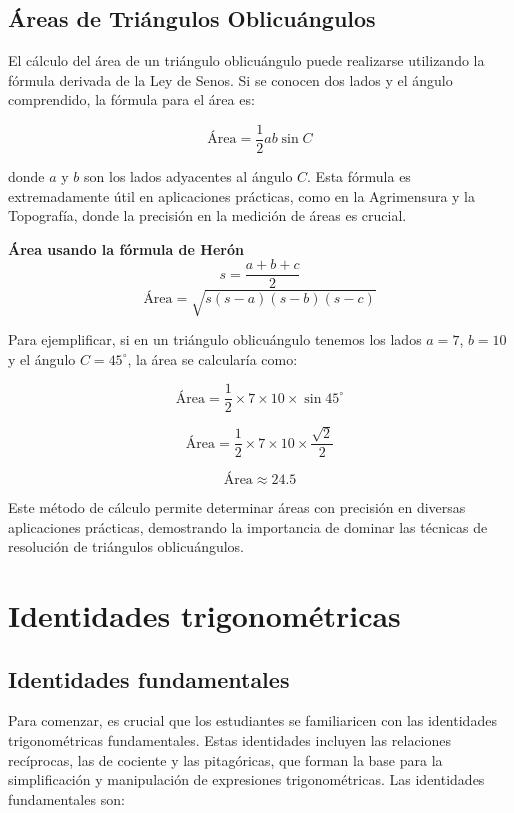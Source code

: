 \subsection{Áreas de Triángulos Oblicuángulos}

El cálculo del área de un triángulo oblicuángulo puede realizarse utilizando la fórmula derivada de la Ley de Senos. Si se conocen dos lados y el ángulo comprendido, la fórmula para el área es:

\[
\text{Área} = \frac{1}{2} ab \sin C
\]

donde \(a\) y \(b\) son los lados adyacentes al ángulo \(C\). Esta fórmula es extremadamente útil en aplicaciones prácticas, como en la Agrimensura y la Topografía, donde la precisión en la medición de áreas es crucial.

\textbf{Área usando la fórmula de Herón}
\begin{equation}
s = \frac{a+b+c}{2}
\end{equation}
\begin{equation}
\text{Área} = \sqrt{s(s-a)(s-b)(s-c)}
\end{equation}


Para ejemplificar, si en un triángulo oblicuángulo tenemos los lados \(a = 7\), \(b = 10\) y el ángulo \(C = 45^\circ\), la área se calcularía como:

\[
\text{Área} = \frac{1}{2} \times 7 \times 10 \times \sin 45^\circ
\]

\[
\text{Área} = \frac{1}{2} \times 7 \times 10 \times \frac{\sqrt{2}}{2}
\]

\[
\text{Área} \approx 24.5
\]

Este método de cálculo permite determinar áreas con precisión en diversas aplicaciones prácticas, demostrando la importancia de dominar las técnicas de resolución de triángulos oblicuángulos.






\section{Identidades trigonométricas} %

\subsection{Identidades fundamentales}

Para comenzar, es crucial que los estudiantes se familiaricen con las identidades trigonométricas fundamentales. Estas identidades incluyen las relaciones recíprocas, las de cociente y las pitagóricas, que forman la base para la simplificación y manipulación de expresiones trigonométricas. Las identidades fundamentales son:

